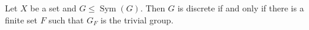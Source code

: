 \documentclass[preview]{standalone}
\begin{document}
\begin{center}
Let $X$ be a set and $G \leq \operatorname{Sym}(G)$. Then $G$ is discrete if and only if there is a finite set $F$ such that $G_F$ is the trivial group.
\end{center}
\end{document}
